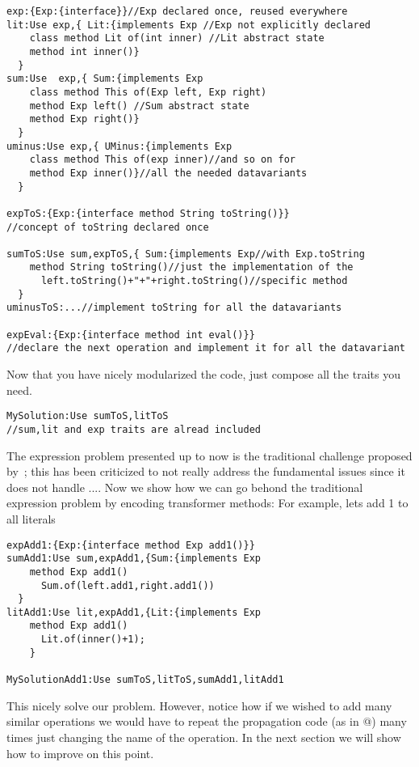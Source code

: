 \begin{lstlisting}
exp:{Exp:{interface}}//Exp declared once, reused everywhere
lit:Use exp,{ Lit:{implements Exp //Exp not explicitly declared
    class method Lit of(int inner) //Lit abstract state
    method int inner()}
  }
sum:Use  exp,{ Sum:{implements Exp 
    class method This of(Exp left, Exp right)
    method Exp left() //Sum abstract state
    method Exp right()}
  }  
uminus:Use exp,{ UMinus:{implements Exp 
    class method This of(exp inner)//and so on for
    method Exp inner()}//all the needed datavariants
  }   
  
expToS:{Exp:{interface method String toString()}}
//concept of toString declared once

sumToS:Use sum,expToS,{ Sum:{implements Exp//with Exp.toString
    method String toString()//just the implementation of the
      left.toString()+"+"+right.toString()//specific method
  }
uminusToS:...//implement toString for all the datavariants

expEval:{Exp:{interface method int eval()}}
//declare the next operation and implement it for all the datavariant
\end{lstlisting}

Now that you have nicely modularized the code, just compose all the traits you need.
\begin{lstlisting}
MySolution:Use sumToS,litToS
//sum,lit and exp traits are alread included
\end{lstlisting}

The expression problem presented up to now is the traditional challenge proposed by~\cite{wadler1998expression};
this has been criticized to not really address the fundamental issues since it does not handle ....
Now we show how we can go behond the traditional expression problem by encoding transformer methods:
For example, lets add 1 to all literals
\begin{lstlisting}
expAdd1:{Exp:{interface method Exp add1()}}
sumAdd1:Use sum,expAdd1,{Sum:{implements Exp
    method Exp add1()
      Sum.of(left.add1,right.add1())
  }
litAdd1:Use lit,expAdd1,{Lit:{implements Exp
    method Exp add1()
      Lit.of(inner()+1);
    }

MySolutionAdd1:Use sumToS,litToS,sumAdd1,litAdd1
\end{lstlisting}

This nicely solve our problem. 
However, notice how if we wished to add many similar operations we would 
have to repeat the propagation code (as in @) many times
just changing the name of the operation.
In the next section we will show how to improve on this point.


